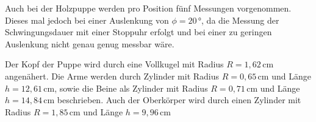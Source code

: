 Auch bei der Holzpuppe werden pro Position fünf
Messungen vorgenommen. Dieses mal jedoch bei einer
Auslenkung von $\phi=20\,\si{\degree}$, da die
Messung der Schwingungsdauer mit einer Stoppuhr
erfolgt und bei einer zu geringen Auslenkung nicht
genau genug messbar wäre.

Der Kopf der Puppe wird durch eine Vollkugel mit 
Radius $R=1,62\,\si{\centi\meter}$ angenähert.
Die Arme werden durch Zylinder mit Radius $R=0,65\,\si{\centi\meter}$
und Länge $h=12,61\,\si{\centi\meter}$, sowie die
Beine als Zylinder mit Radius $R=0,71\,\si{\centi\meter}$
und Länge $h=14,84\,\si{\centi\meter}$ beschrieben.
Auch der Oberkörper wird durch einen Zylinder mit 
Radius $R=1,85\,\si{\centi\meter}$
und Länge $h=9,96\,\si{\centi\meter}$
